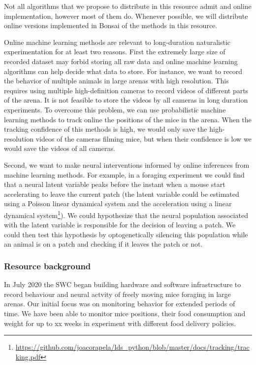Not all algorithms that we propose to distribute in this resource admit and
online implementation, however most of them do. Whenever possible, we will
distribute online versions implemented in Bonsai of the methods in this
resource.

Online machine learning methods are relevant to long-duration naturalistic
experimentation for at least two reasons. First the extremely large size of
recorded dataset may forbid storing all raw data and online machine learning
algorithms can help decide what data to store. For instance, we want to record
the behavior of multiple animals in large arenas with high resolution. This
requires using multiple high-definition cameras to record videos of different
parts of the arena. It is not feasible to store the videos by all cameras in
long duration experiments. To overcome this problem, we can use probabilistic
machine learning methods to track online the positions of the mice in the
arena. When the tracking confidence of this methods is high, we would only save
the high-resolution videos of the cameras filming mice, but when their
confidence is low we would save the videos of all cameras.

Second, we want to make neural interventions informed by online inferences from
machine learning methods. For example, in a foraging experiment we could find
that a neural latent variable peaks before the instant when a mouse start
accelerating to leave the current patch (the latent variable could be estimated
using a Poisson linear dynamical system and the acceleration using a linear
dynamical
system\footnote{\url{https://github.com/joacorapela/lds_python/blob/master/docs/tracking/tracking.pdf}}).
We could hypothesize that the neural population associated with the latent
variable is responsible for the decision of leaving a patch. We could then test
this hypothesis by optogenetically silencing this population while an animal is
on a patch and checking if it leaves the patch or not.

\subsubsection*{Resource background}

In July 2020 the SWC began building hardware and software infrastructure to
record behaviour and neural actvity of freely moving mice foraging in large
arenas. Our initial focus was on monitoring behavior for extended periods of
time. We have been able to monitor mice positions, their food consumption and
weight for up to xx weeks in experiment with different food delivery policies.

